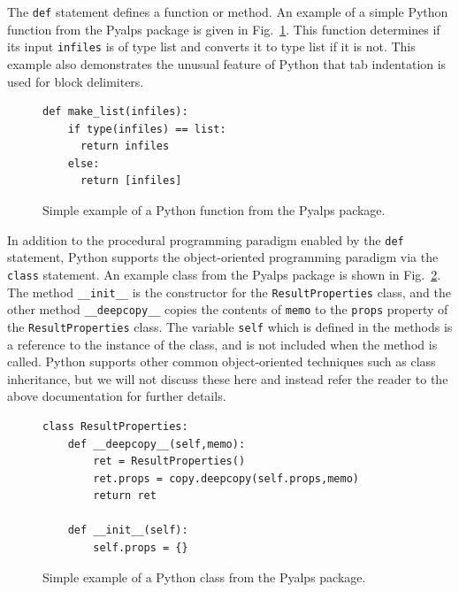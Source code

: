 \documentclass[12pt]{iopart}
\begin{document}
The {\tt def} statement defines a function or method.  An example of a simple Python function from the Pyalps package is given in Fig.~\ref{fig:Pythonfunction}.  This function determines if its input {\tt infiles} is of type list and converts it to type list if it is not.  This example also demonstrates the unusual feature of Python that tab indentation is used for block delimiters.
\begin{figure}[h]
\begin{tiny}
\begin{center}
\begin{verbatim}
def make_list(infiles):
    if type(infiles) == list:
      return infiles
    else:
      return [infiles]
\end{verbatim}
\end{center}
\end{tiny}
\caption{Simple example of a Python function from the Pyalps package.}
\label{fig:Pythonfunction}
\end{figure}

In addition to the procedural programming paradigm enabled by the {\tt def} statement, Python supports the object-oriented programming paradigm via the {\tt class} statement.  An example class from the Pyalps package is shown in Fig.~\ref{fig:Pythonclass}.  The method {\tt \_\_init\_\_} is the constructor for the {\tt ResultProperties} class, and the other method {\tt \_\_deepcopy\_\_} copies the contents of {\tt memo} to the {\tt props} property of the {\tt ResultProperties} class.  The variable {\tt self} which is defined in the methods is a reference to the instance of the class, and is not included when the method is called.  Python supports other common object-oriented techniques such as class inheritance, but we will not discuss these here and instead refer the reader to the above documentation for further details.
\begin{figure}[h]
\begin{tiny}
\begin{center}
\begin{verbatim}
class ResultProperties:
    def __deepcopy__(self,memo):
        ret = ResultProperties()
        ret.props = copy.deepcopy(self.props,memo)
        return ret
    
    def __init__(self):
        self.props = {}
\end{verbatim}
\end{center}
\end{tiny}
\caption{Simple example of a Python class from the Pyalps package.}
\label{fig:Pythonclass}
\end{figure}
\end{document}
